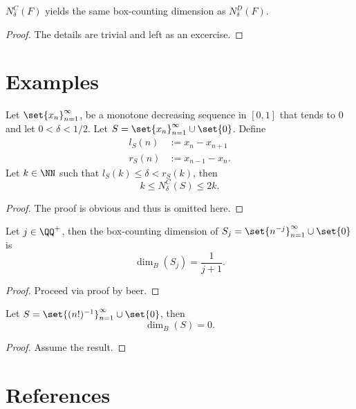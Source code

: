 \documentclass[notitlepage,12pt]{paper}
\def\dim{\operatorname{dim}}
\begin{document}
\begin{thm}
	$N^C_\delta(F)$ yields the same box-counting dimension as $N^D_\delta(F)$.
\end{thm}
\begin{proof}
	The details are trivial and left as an excercise.
\end{proof}

\section{Examples}

\begin{lem}
	Let $\set{x_n}_{n=1}^\infty$, be a monotone decreasing sequence in $[0,1]$ that tends to 0 and let $0 < \delta < 1/2$.
	Let $S=\set{x_n}_{n=1}^\infty\cup\set{0}$.
	Define
	\begin{align*}
		l_S(n)&:= x_n-x_{n+1}\\
		r_S(n)&:= x_{n-1}-x_n.
	\end{align*}
	Let $k\in\NN$ such that $l_S(k)\leq \delta < r_S(k)$, then
	\[
		k \leq N^C_\delta(S)\leq 2k.
	\]
\end{lem}
\begin{proof}
	The proof is obvious and thus is omitted here.
\end{proof}

\begin{example}
	Let $j\in\QQ^+$, then the box-counting dimension of $S_j=\set{n^{-j}}_{n=1}^\infty\cup\set{0}$ is
	\[
		\dim_B(S_j)=\frac{1}{j+1}.
	\]
\end{example}
\begin{proof}
	Proceed via proof by beer.
\end{proof}

\begin{example}
	Let $S=\set{(n!)^{-1}}_{n=1}^\infty\cup\set{0}$, then
	\[
		\dim_B(S)=0.
	\]
\end{example}
\begin{proof}
	Assume the result.
\end{proof}

\section*{References}
\end{document}
